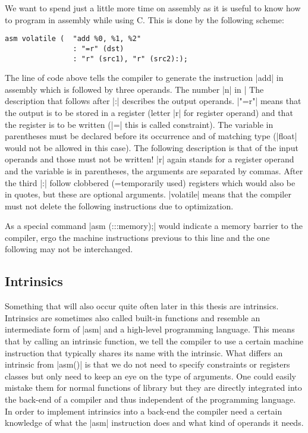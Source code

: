We want to spend just a little more time on assembly as it is useful to know how to program in assembly while using C.
This is done by the following scheme:
\begin{lstlisting}
asm volatile (  "add %0, %1, %2"
                : "=r" (dst)
                : "r" (src1), "r" (src2):);
\end{lstlisting}

The line of code above tells the compiler to generate the instruction |add| in assembly which is followed by three operands.
The number |n| in |%
The description that follows after |:| describes the output operands.
|"=r"| means that the output is to be stored in a register (letter |r| for register operand) and that the register is to be written (|=| this is called constraint).
The variable in parentheses must be declared before its occurrence and of matching type (|float| would not be allowed in this case).
The following description is that of the input operands and those must not be written!
|r| again stands for a register operand and the variable is in parentheses, the arguments are separated by commas.
After the third |:| follow clobbered (=temporarily used) registers which would also be in quotes, but these are optional arguments.
|volatile| means that the compiler must not delete the following instructions due to optimization.

As a special command |asm (:::memory);| would indicate a memory barrier to the compiler, ergo the machine instructions previous to this line and the one following may not be interchanged.

\subsection{Intrinsics}
Something that will also occur quite often later in this thesis are intrinsics.
Intrinsics are sometimes also called built-in functions and resemble an intermediate form of |asm| and a high-level programming language.
This means that by calling an intrinsic function, we tell the compiler to use a certain machine instruction that typically shares its name with the intrinsic.
What differs an intrinsic from |asm()| is that we do not need to specify constraints or registers classes but only need to keep an eye on the type of arguments.
One could easily mistake them for normal functions of library but they are directly integrated into the back-end of a compiler and thus independent of the programming language.
In order to implement intrinsics into a back-end the compiler need a certain knowledge of what the |asm| instruction does and what kind of operands it needs.

